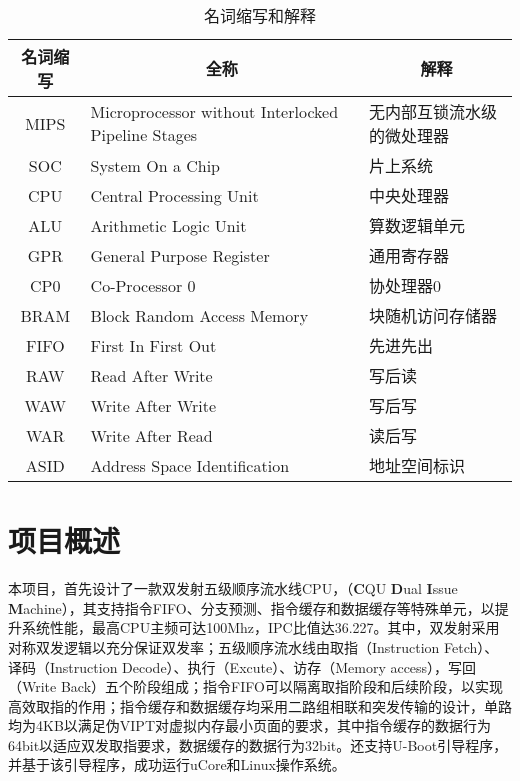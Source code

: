 \begin{table}[!htbp]
    \centering
    \caption{名词缩写和解释}
    \label{table:abbreviation_definition}
    
    \begin{tabular}{cll}
    \toprule
    \multicolumn{1}{c}{\textbf{名词缩写}} & \multicolumn{1}{c}{\textbf{全称}}                   & \multicolumn{1}{c}{\textbf{解释}} \\ 
    \midrule
    MIPS                               & Microprocessor without Interlocked Pipeline Stages & 无内部互锁流水级的微处理器 \\
    SOC                                & System On a Chip                                   & 片上系统 \\
    CPU                                & Central Processing Unit                            & 中央处理器 \\
    ALU                                & Arithmetic Logic Unit                              & 算数逻辑单元 \\
    GPR                                & General Purpose Register                           & 通用寄存器 \\
    CP0                                & Co-Processor 0                                     & 协处理器0 \\
    BRAM                               & Block Random Access Memory                         & 块随机访问存储器 \\
    FIFO                               & First In First Out                                 & 先进先出 \\
    RAW                                & Read After Write                                   & 写后读 \\
    WAW                                & Write After Write                                  & 写后写 \\
    WAR                                & Write After Read                                   & 读后写 \\
    ASID                               & Address Space Identification                       & 地址空间标识 \\
    \bottomrule
    \end{tabular}
\end{table}

\section{项目概述}
本项目，首先设计了一款双发射五级顺序流水线CPU，\cpuname（\textbf{C}QU \textbf{D}ual \textbf{I}ssue \textbf{M}achine），其支持指令FIFO、分支预测、指令缓存和数据缓存等特殊单元，以提升系统性能，最高CPU主频可达100Mhz，IPC比值达36.227。其中，双发射采用对称双发逻辑以充分保证双发率；五级顺序流水线由取指（Instruction Fetch）、译码（Instruction Decode）、执行（Excute）、访存（Memory access），写回（Write Back）五个阶段组成；指令FIFO可以隔离取指阶段和后续阶段，以实现高效取指的作用；指令缓存和数据缓存均采用二路组相联和突发传输的设计，单路均为4KB以满足伪VIPT对虚拟内存最小页面的要求，其中指令缓存的数据行为64bit以适应双发取指要求，数据缓存的数据行为32bit。\cpuname 还支持U-Boot引导程序，并基于该引导程序，成功运行uCore和Linux操作系统。

